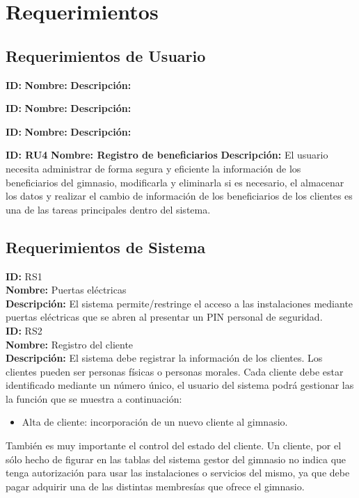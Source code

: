 \chapter*{Requerimientos}\label{cap.requerimientos}


\section{Requerimientos de Usuario}

\textbf{ID: }
\textbf{Nombre: }
\textbf{Descripci\'on: }

\textbf{ID: }
\textbf{Nombre: }
\textbf{Descripci\'on: }

\textbf{ID: }
\textbf{Nombre: }
\textbf{Descripci\'on: }

\textbf{ID: RU4}
\textbf{Nombre: Registro de beneficiarios }
\textbf{Descripci\'on: } El usuario necesita administrar de forma segura y eficiente la información de los beneficiarios del gimnasio, modificarla y eliminarla si es necesario, el almacenar los datos y realizar el cambio de información de los beneficiarios de los clientes es una de las tareas principales dentro del sistema.\\

\section{Requerimientos de Sistema}
\textbf{ID: } RS1 \\
\textbf{Nombre:} Puertas eléctricas \\
\textbf{Descripción:} El sistema permite/restringe el acceso a las instalaciones mediante puertas eléctricas que se abren al presentar un PIN personal de seguridad.\\

\textbf{ID: } RS2\\
\textbf{Nombre: }Registro del cliente\\
\textbf{Descripción:} El sistema debe registrar la información de los clientes. Los clientes pueden ser personas físicas o personas morales. Cada cliente debe estar identificado mediante un número único, el usuario del sistema podrá gestionar las la función que se muestra a continuación:\\
	\begin{itemize} 
		\item Alta de cliente: incorporación de un nuevo cliente al gimnasio.
	\end{itemize}
También es muy importante el control del estado del cliente. Un cliente, por el sólo hecho de figurar en las tablas del sistema gestor del gimnasio no indica que tenga autorización para usar las instalaciones o servicios del mismo, ya que debe pagar adquirir una de las distintas membresías que ofrece el gimnasio.\\



